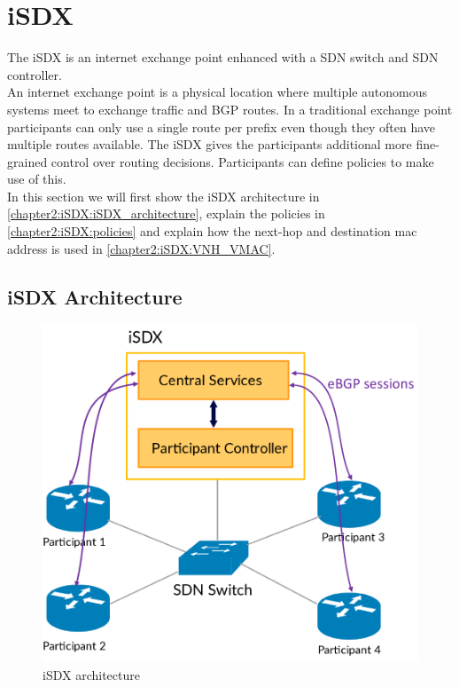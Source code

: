 \section{\label{chapter2:iSDX}iSDX}

The iSDX is an internet exchange point enhanced with a SDN switch and SDN controller.\\
An internet exchange point is a physical location where multiple autonomous systems meet to exchange traffic and BGP routes. In a traditional exchange point participants can only use a single route per prefix even though they often have multiple routes available. The iSDX gives the participants additional more fine-grained control over routing decisions. Participants can define policies to make use of this.  \\
In this section we will first show the iSDX architecture in \ref{chapter2:iSDX:iSDX_architecture}, explain the policies in \ref{chapter2:iSDX:policies} and explain how the next-hop and destination mac address is used in \ref{chapter2:iSDX:VNH_VMAC}.

\subsection{\label{chapter2:iSDX:iSDX_architecture}iSDX Architecture}
\begin{figure}[h]
\includegraphics[scale = 0.4]{Figures/isdx_architecture_cropped.pdf}
\caption{iSDX architecture}
\end{figure}

